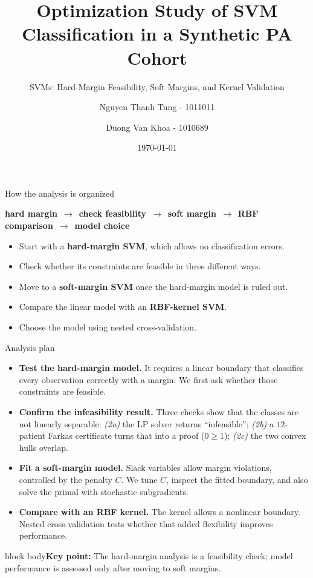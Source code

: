 \documentclass[aspectratio=169,11pt]{beamer}
\title{Optimization Study of SVM Classification in a Synthetic PA Cohort}
\subtitle{SVMs: Hard-Margin Feasibility, Soft Margins, and Kernel Validation}
\author{Nguyen Thanh Tung - 1011011 \and Duong Van Khoa - 1010689}
\institute{Optimization for Data Science Project \\ Singapore University of Technology and Design}
\date{\today}
\newcommand{\take}[1]{\vspace{0.3em}\begin{beamercolorbox}[wd=\textwidth,sep=6pt,rounded=true]{block body}\color{darkink}\small\textbf{Key point:} #1\end{beamercolorbox}}
\begin{document}
\begin{frame}[plain]
  \titlepage
\end{frame}

\begin{frame}{How the analysis is organized}
  \vspace{0.5em}
  \begin{center}
    \large
    \textcolor{UPAblue}{\textbf{hard margin}}
    $\,\rightarrow\,$
    \textcolor{BPAorange}{\textbf{check feasibility}}
    $\,\rightarrow\,$
    \textcolor{UPAblue}{\textbf{soft margin}}
    $\,\rightarrow\,$
    \textcolor{BPAorange}{\textbf{RBF comparison}}
    $\,\rightarrow\,$
    \textcolor{UPAblue}{\textbf{model choice}}
  \end{center}
  \vspace{1em}
  \begin{itemize}
    \item Start with a \textbf{hard-margin SVM}, which allows no classification errors.
    \item Check whether its constraints are feasible in three different ways.
    \item Move to a \textbf{soft-margin SVM} once the hard-margin model is ruled out.
    \item Compare the linear model with an \textbf{RBF-kernel SVM}.
    \item Choose the model using nested cross-validation.
  \end{itemize}
\end{frame}

\begin{frame}{Analysis plan}
  \small
  \begin{itemize}\setlength\itemsep{5pt}
    \item[\textcolor{UPAblue}{\textbf{1}}] \textbf{Test the hard-margin model.}
      It requires a linear boundary that classifies every observation correctly with a margin.
      We first ask whether those constraints are feasible.
    \item[\textcolor{BPAorange}{\textbf{2}}] \textbf{Confirm the infeasibility result.}
      Three checks show that the classes are not linearly separable:
      \emph{(2a)} the LP solver returns ``infeasible''; \emph{(2b)} a $12$-patient Farkas
      certificate turns that into a proof ($0\ge 1$); \emph{(2c)} the two convex hulls overlap.
    \item[\textcolor{UPAblue}{\textbf{3}}] \textbf{Fit a soft-margin model.}
      Slack variables allow margin violations, controlled by the penalty $C$.
      We tune $C$, inspect the fitted boundary, and also solve the primal with stochastic subgradients.
    \item[\textcolor{BPAorange}{\textbf{4}}] \textbf{Compare with an RBF kernel.}
      The kernel allows a nonlinear boundary. Nested cross-validation tests whether that
      added flexibility improves performance.
  \end{itemize}
  \take{The hard-margin analysis is a feasibility check; model performance is assessed only after moving to soft margins.}
\end{frame}
\end{document}
